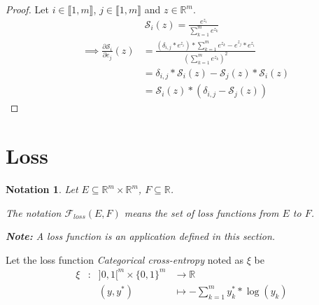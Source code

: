 \documentclass[11pt,en]{elegantpaper}
\newtheorem{notation}{Notation}
\newcommand{\Real}{\mathbb{R}}
\begin{document}
\begin{proof}
  Let $i \in \llbracket 1,m \rrbracket$, $j \in \llbracket 1,m \rrbracket$ and $z \in \Real^m$. \begin{equation*}
    \begin{gathered}
      \mathcal{S}_i(z) = \frac{e^{z_i}}{\sum_{k=1}^m e^{z_k}}
    \end{gathered}
  \end{equation*}
  \begin{equation*}
    \begin{array}{lll}
      & \implies \frac{\partial \mathcal{S}_i}{\partial e_j} (z) & = \frac{(\delta_{i,j} * e^{z_i}) * {\sum_{k=1}^m e^{z_k}} - e^{z_j} * e^{z_i}}{(\sum_{k=1}^m e^{z_k})^2} \\
      & & = \delta_{i,j} * \mathcal{S}_i(z) - \mathcal{S}_j(z) * \mathcal{S}_i(z) \\
      & & = \mathcal{S}_i(z) * (\delta_{i,j} - \mathcal{S}_j(z))
    \end{array}
  \end{equation*}
\end{proof}

\section{Loss}

\begin{notation}
  Let $E \subseteq \Real^m \times \Real^m$, $F \subseteq \Real$. \par
  The notation $\mathcal{F}_{loss}(E,F)$ means the set of loss functions from $E$ to $F$. \par
  \textbf{Note:} A loss function is an application defined in this section. \par
\end{notation}

\begin{definition}
  Let the loss function \textit{Categorical cross-entropy} noted as $\xi$ be
  \begin{equation*}
    \begin{array}{llll}
      \xi & : & ]0,1[^m \times \{0,1\}^m & \longrightarrow \Real \\
      &   & (y,y^*) & \longmapsto - \sum_{k=1}^m y_k^* * \log(y_k)
    \end{array}
  \end{equation*} \par
\end{definition}
\end{document}
